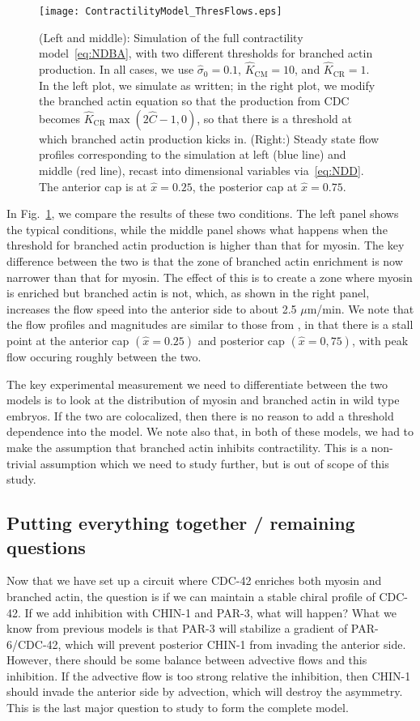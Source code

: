 \documentclass[11pt]{article}
\newcommand{\red}[1]{\color{red}#1\normalcolor}
\newcommand{\6}[1]{#1_{\text{6}}}
\newcommand{\3}[1]{#1_{\text{3}}}
\begin{document}
\begin{figure}
\centering
\texttt{[image: ContractilityModel\_ThresFlows.eps]}
\caption{\label{fig:BAThres}(Left and middle): Simulation of the full contractility model\ \eqref{eq:NDBA}, with two different thresholds for branched actin production. In all cases, we use $\hat{\sigma}_0=0.1$, $\hat K_\text{CM}=10$, and $\hat K_\text{CR}=1$. In the left plot, we simulate as written; in the right plot, we modify the branched actin equation so that the production from CDC becomes $\hat{K}_\text{CR}\max{\left(2\hat C-1,0\right)}$, so that there is a threshold at which branched actin production kicks in. (Right:) Steady state flow profiles corresponding to the simulation at left (blue line) and middle (red line), recast into dimensional variables via\ \eqref{eq:NDD}. The anterior cap is at $\hat{x}=0.25$, the posterior cap at $\hat x = 0.75$. }
\end{figure}

In Fig.\ \ref{fig:BAThres}, we compare the results of these two conditions. The left panel shows the typical conditions, while the middle panel shows what happens when the threshold for branched actin production is higher than that for myosin. The key difference between the two is that the zone of branched actin enrichment is now narrower than that for myosin. The effect of this is to create a zone where myosin is enriched but branched actin is not, which, as shown in the right panel, increases the flow speed into the anterior side to about 2.5 $\mu$m/min. We note that the flow profiles and magnitudes are similar to those from \cite[Fig.~2B]{sailer2015dynamic}, in that there is a stall point at the anterior cap $\left(\hat x = 0.25\right)$ and posterior cap $\left(\hat x = 0,75 \right)$, with peak flow occuring roughly between the two. 

The key experimental measurement we need to differentiate between the two models is to look at the distribution of myosin and branched actin in wild type embryos. If the two are colocalized, then there is no reason to add a threshold dependence into the model. We note also that, in both of these models, we had to make the assumption that branched actin inhibits contractility. This is a non-trivial assumption which we need to study further, but is out of scope of this study.


\subsection{Putting everything together / remaining questions}
\red{Now that we have set up a circuit where CDC-42 enriches both myosin and branched actin, the question is if we can maintain a stable chiral profile of CDC-42. If we add inhibition with CHIN-1 and PAR-3, what will happen? What we know from previous models is that PAR-3 will stabilize a gradient of PAR-6/CDC-42, which will prevent posterior CHIN-1 from invading the anterior side. However, there should be some balance between advective flows and this inhibition. If the advective flow is too strong relative the inhibition, then CHIN-1 should invade the anterior side by advection, which will destroy the asymmetry. This is the last major question to study to form the complete model. }

\fi




\end{document}
